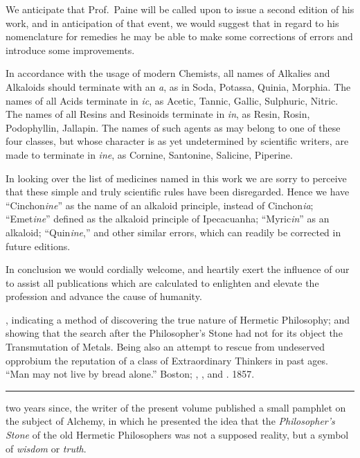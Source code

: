 
We anticipate that Prof.\ Paine will be called upon to issue a second
edition of his work, and in anticipation of that event, we would suggest
that in regard to his nomenclature for remedies he may be able to
make some corrections of errors and introduce some improvements.

In accordance with the usage of modern Chemists, all names of
Alkalies and Alkaloids should terminate with an \emph{a}, as in Soda, Potassa,
Quinia, Morphia. The names of all Acids terminate in \emph{ic}, as Acetic,
Tannic, Gallic, Sulphuric, Nitric. The names of all Resins and Resinoids
terminate in \emph{in}, as Resin, Rosin, Podophyllin, Jallapin. The
names of such agents as may belong to one of these four classes, but
whose character is as yet undetermined by scientific writers, are made
to terminate in \emph{ine}, as Cornine, Santonine, Salicine, Piperine.

In looking over the list of medicines named in this work we are sorry
to perceive that these simple and truly scientific rules have been disregarded.
Hence we have ``Cinchon\textit{ine}'' as the name of an alkaloid
principle, instead of Cinchon\textit{ia}; ``Emet\textit{ine}'' defined as the alkaloid
principle of Ipecacuanha; ``Myric\textit{in}'' as an alkaloid; ``Quin\textit{ine},''
and other similar errors, which can readily be corrected in future editions.

In conclusion we would cordially welcome, and heartily exert the influence
of our  to assist all publications which are calculated to
enlighten and elevate the profession and advance the cause of humanity.

\smallornament
\footnotesize
{}, indicating a method of discovering the true
nature of Hermetic Philosophy; and showing that the search after the Philosopher's
Stone had not for its object the Transmutation of Metals. Being also an attempt to
rescue from undeserved opprobium the reputation of a class of Extraordinary Thinkers
in past ages. ``Man may not live by bread alone.'' Boston; , , and
. 1857.
\plainbreak{1}
\normalsize


 two years since, the writer of the present volume published a
small pamphlet on the subject of Alchemy, in which he presented the
idea that the \emph{Philosopher's Stone} of the old Hermetic Philosophers
was not a supposed reality, but a symbol of \emph{wisdom} or \emph{truth}.

